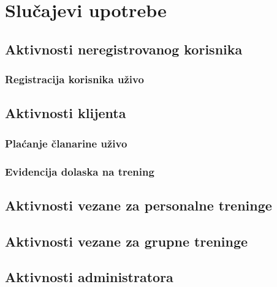 \documentclass[a4paper]{article}
\begin{document}
    
    

\section{Slučajevi upotrebe}

\subsection{Aktivnosti neregistrovanog korisnika}
\subsubsection{Registracija korisnika uživo}


\subsection{Aktivnosti klijenta}
\subsubsection{Plaćanje članarine uživo}


\subsubsection{Evidencija dolaska na trening}


\newpage
\subsection{Aktivnosti vezane za personalne treninge}


\subsection{Aktivnosti vezane za grupne treninge}


\subsection{Aktivnosti administratora}
\end{document}
